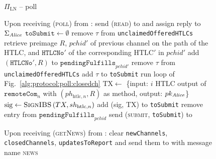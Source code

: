   \begin{figure}[H]
    \begin{protocolbox}{$\Pi_{\mathrm{LN}}$ -- poll}
      \begin{algorithmic}[1]
        \State Upon receiving (\textsc{poll}) from \environment:
        \Indent
          \State send (\textsc{read}) to \ledger{} and assign reply to
          $\Sigma_{\mathit{Alice}}$
          \label{alg:protocol:poll:read}
          \State $\mathtt{toSubmit} \gets \emptyset$
          \label{alg:protocol:poll:afterread}
             
              \State remove $\tau$ from \texttt{unclaimedOfferedHTLCs}
                \State retrieve preimage $R$, $\mathit{pchid}'$ of previous
                channel on the path of the HTLC, and $\mathtt{HTLCNo}'$ of the
                corresponding $\mathrm{HTLC}'$ in $\mathit{pchid}'$
                \State add $\left(\mathtt{HTLCNo}', R\right)$ to
                $\mathtt{pendingFulfills}_{\mathit{pchid}'}$
              \EndIf
              \State remove $\tau$ from \texttt{unclaimedOfferedHTLCs}
              \State add $\tau$ to \texttt{toSubmit}
            \EndIf
          \EndFor
          \State run loop of Fig.~\ref{alg:protocol:poll:closedch}
                \State $\mathrm{TX} \gets$ \{input: $i$ HTLC output of
                $\mathtt{remoteCom}_n$ with $\left(ph_{\mathrm{htlc}, n},
                R\right)$ as method, output: $pk_{\mathit{Alice}}$\}
                \State $\mathrm{sig} \gets \textsc{SignIBS}\left(TX,
                sh_{\mathrm{htlc}, n}\right)$
                \State add (sig, TX) to \texttt{toSubmit}
                \State remove entry from
                $\mathtt{pendingFulfills}_{\mathit{pchid}}$
              \EndIf
            \EndFor
          \EndFor
          \label{alg:protocol:poll:beforesubmit}
          \State send (\textsc{submit}, \texttt{toSubmit}) to \ledger
          \label{alg:protocol:poll:submit}
        \EndIndent
        \Statex

        \State Upon receiving (\textsc{getNews}) from \environment:
        \label{alg:protocol:getnews}
        \Indent
          \State clear \texttt{newChannels}, \texttt{closedChannels},
          \texttt{updatesToReport} and send them to \environment{} with message
          name \textsc{news}
          \label{alg:protocol:getnews:send}
        \EndIndent
      \end{algorithmic}
    \end{protocolbox}
    \caption{}
    \label{alg:protocol:poll}
  \end{figure}

